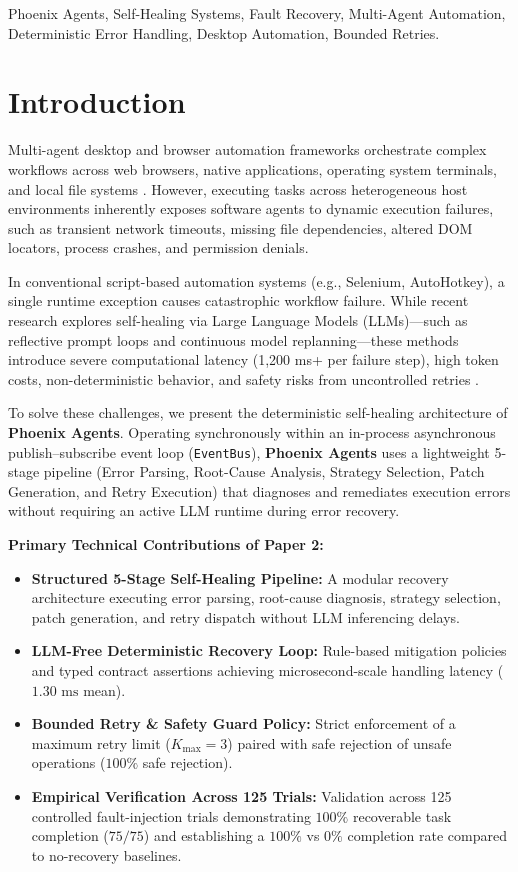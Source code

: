 \documentclass[conference]{IEEEtran}
\begin{document}
\begin{IEEEkeywords}
Phoenix Agents, Self-Healing Systems, Fault Recovery, Multi-Agent Automation, Deterministic Error Handling, Desktop Automation, Bounded Retries.
\end{IEEEkeywords}

\section{Introduction}
\label{sec:intro}
Multi-agent desktop and browser automation frameworks orchestrate complex workflows across web browsers, native applications, operating system terminals, and local file systems \cite{bajoria2026}. However, executing tasks across heterogeneous host environments inherently exposes software agents to dynamic execution failures, such as transient network timeouts, missing file dependencies, altered DOM locators, process crashes, and permission denials.

In conventional script-based automation systems (e.g., Selenium, AutoHotkey), a single runtime exception causes catastrophic workflow failure. While recent research explores self-healing via Large Language Models (LLMs)—such as reflective prompt loops and continuous model replanning—these methods introduce severe computational latency (1,200 ms+ per failure step), high token costs, non-deterministic behavior, and safety risks from uncontrolled retries \cite{babu2026, jeong2026}.

To solve these challenges, we present the deterministic self-healing architecture of \textbf{Phoenix Agents}. Operating synchronously within an in-process asynchronous publish--subscribe event loop (\texttt{EventBus}), \textbf{Phoenix Agents} uses a lightweight 5-stage pipeline (Error Parsing, Root-Cause Analysis, Strategy Selection, Patch Generation, and Retry Execution) that diagnoses and remediates execution errors without requiring an active LLM runtime during error recovery.

\textbf{Primary Technical Contributions of Paper 2:}
\begin{itemize}
    \item \textbf{Structured 5-Stage Self-Healing Pipeline:} A modular recovery architecture executing error parsing, root-cause diagnosis, strategy selection, patch generation, and retry dispatch without LLM inferencing delays.
    \item \textbf{LLM-Free Deterministic Recovery Loop:} Rule-based mitigation policies and typed contract assertions achieving microsecond-scale handling latency ($1.30\text{ ms}$ mean).
    \item \textbf{Bounded Retry \& Safety Guard Policy:} Strict enforcement of a maximum retry limit ($K_{\text{max}}=3$) paired with safe rejection of unsafe operations ($100\%$ safe rejection).
    \item \textbf{Empirical Verification Across 125 Trials:} Validation across 125 controlled fault-injection trials demonstrating $100\%$ recoverable task completion ($75/75$) and establishing a $100\%$ vs $0\%$ completion rate compared to no-recovery baselines.
\end{itemize}
\end{document}
